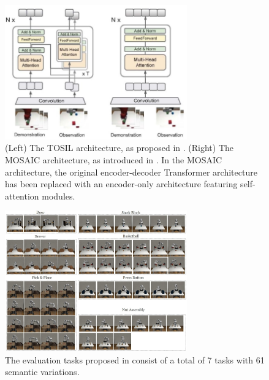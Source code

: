 \begin{figure}[t]
    \centering
    \includegraphics[width=0.7\textwidth]{figures/images/mosaic/architecture_comparison.jpg}
    \caption{(Left) The TOSIL architecture, as proposed in \cite{dasari2021transformers_one_shot}. (Right) The MOSAIC architecture, as introduced in \cite{mandi2022towards_more_generalizable_one_shot}. In the MOSAIC architecture, the original encoder-decoder Transformer architecture has been replaced with an encoder-only architecture featuring self-attention modules.}
    \label{fig:mosaic_architecture}
\end{figure}

\begin{figure}[t]
    \centering
    \includegraphics[width=0.7\textwidth]{figures/images/mosaic/mosaic_tasks.jpg}
    \caption{The evaluation tasks proposed in \cite{mandi2022towards_more_generalizable_one_shot} consist of a total of 7 tasks with 61 semantic variations.}
    \label{fig:mosaic_task}
\end{figure}